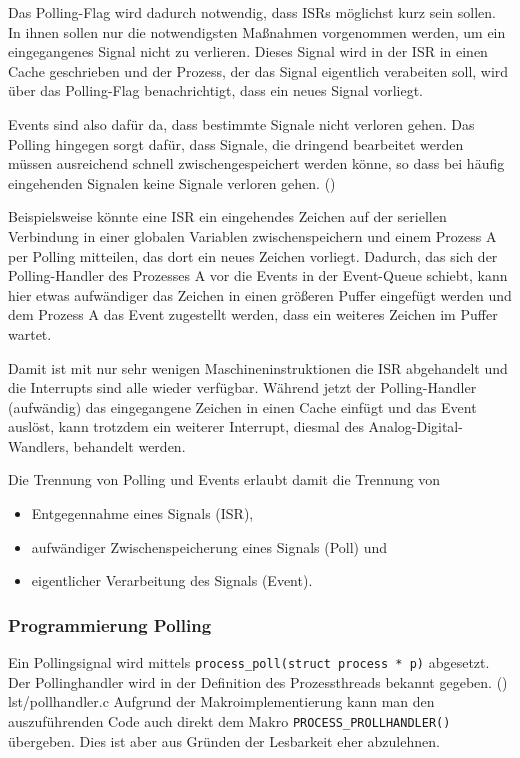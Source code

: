	Das Polling-Flag wird dadurch notwendig, dass \acp{ISR} möglichst
	kurz sein sollen.  In ihnen sollen nur die notwendigsten Maßnahmen
	vorgenommen werden, um \zB ein eingegangenes Signal nicht zu verlieren.
	Dieses Signal wird in der \ac{ISR} in einen Cache geschrieben und
	der Prozess, der das Signal eigentlich verabeiten soll, wird über
	das Polling-Flag benachrichtigt, dass ein neues Signal vorliegt.

	Events sind also dafür da, dass bestimmte Signale nicht verloren gehen.
	Das Polling hingegen sorgt dafür, dass Signale, die dringend bearbeitet
	werden müssen ausreichend schnell zwischengespeichert werden könne, so
	dass bei häufig eingehenden Signalen keine Signale verloren gehen.
	()
	

	Beispielsweise könnte eine \ac{ISR} ein eingehendes Zeichen auf der
	seriellen Verbindung in einer globalen Variablen zwischenspeichern
	und einem Prozess A per Polling mitteilen, das dort ein neues Zeichen
	vorliegt.  Dadurch, das sich der Polling-Handler des Prozesses A vor
	die Events in der Event-Queue schiebt, kann hier etwas aufwändiger
	das Zeichen in einen größeren Puffer eingefügt werden und dem
	Prozess A das Event zugestellt werden, dass ein weiteres Zeichen im
	Puffer wartet.

	Damit ist mit nur sehr wenigen Maschineninstruktionen die \ac{ISR}
	abgehandelt und die Interrupts sind alle wieder verfügbar.  Während
	jetzt der Polling-Handler (aufwändig) das eingegangene Zeichen in
	einen Cache einfügt und das Event auslöst, kann \zB trotzdem ein
	weiterer Interrupt, \zB diesmal des Analog-Digital-Wandlers, behandelt
	werden.

	Die Trennung von Polling und Events erlaubt damit die Trennung von
	\begin{itemize}
	\item	Entgegennahme eines Signals (\ac{ISR}),
	\item	aufwändiger Zwischenspeicherung eines Signals (Poll) und
	\item	eigentlicher Verarbeitung des Signals (Event).
	\end{itemize}

\subsubsection{Programmierung Polling}
	Ein Pollingsignal wird mittels
	\lstinline=process_poll(struct process * p)= abgesetzt.
	Der Pollinghandler wird in der Definition des Prozessthreads bekannt
	gegeben. ()
			{lst/pollhandler.c}
	Aufgrund der Makroimplementierung kann man den auszuführenden Code auch
	direkt dem Makro \lstinline=PROCESS_PROLLHANDLER()= übergeben.  Dies ist
	aber aus Gründen der Lesbarkeit eher abzulehnen.

